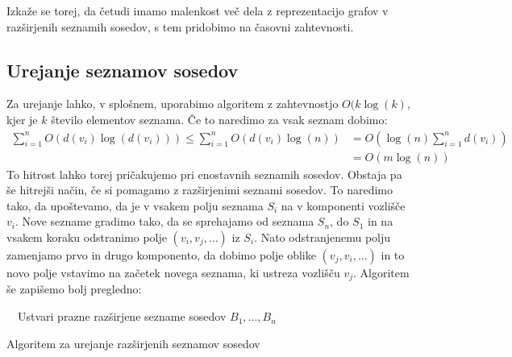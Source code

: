 \documentclass[a4paper, 10pt]{article}
\begin{document}
	Izkaže se torej, da četudi imamo malenkost več dela z reprezentacijo grafov v razširjenih seznamih sosedov, s tem pridobimo na časovni zahtevnosti.
	
	\subsection{Urejanje seznamov sosedov}
	Za urejanje lahko, v splošnem, uporabimo algoritem z zahtevnostjo $O(k\log(k)$, kjer je $k$ število elementov seznama. Če to naredimo za vsak seznam dobimo: \begin{align*}
		\sum_{i=1}^{n} O(d(v_i)\log(d(v_i))) \leq \sum_{i=1}^{n} O(d(v_i)\log(n)) &= O(\log(n)\sum_{i=1}^{n}d(v_i)) \\
		&= O(m\log(n)) 
	\end{align*}
	To hitrost lahko torej pričakujemo pri enostavnih seznamih sosedov. Obstaja pa še hitrejši način, če si pomagamo z razširjenimi seznami sosedov. To naredimo tako, da upoštevamo, da je v vsakem polju seznama $S_i$ na v komponenti vozlišče $v_i$.
	Nove sezname gradimo tako, da se sprehajamo od seznama $S_n$, do $S_1$ in na vsakem koraku odstranimo polje $(v_i, v_j, \ldots)$ iz $S_i$. Nato odstranjenemu polju zamenjamo prvo in drugo komponento, da dobimo polje oblike $(v_j, v_i, \ldots)$ in to novo polje vstavimo na začetek novega seznama, ki ustreza vozlišču $v_j$. Algoritem še zapišemo bolj pregledno:
	\begin{algorithm}[h!]
		\DontPrintSemicolon
			~~Ustvari prazne razširjene sezname sosedov $B_1,\ldots, B_n$\;
			\caption{Algoritem za urejanje razširjenih seznamov sosedov}\label{alg:uredrazsezsos}
	\end{algorithm}
		
\end{document}
